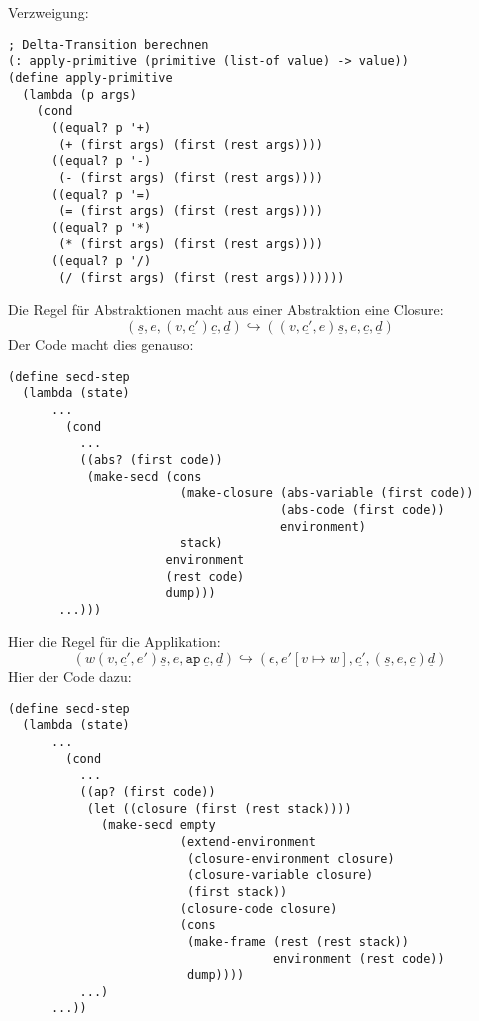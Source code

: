 Verzweigung:
%
\begin{verbatim}
; Delta-Transition berechnen
(: apply-primitive (primitive (list-of value) -> value))
(define apply-primitive
  (lambda (p args)
    (cond
      ((equal? p '+)
       (+ (first args) (first (rest args))))
      ((equal? p '-)
       (- (first args) (first (rest args))))
      ((equal? p '=)
       (= (first args) (first (rest args))))
      ((equal? p '*)
       (* (first args) (first (rest args))))
      ((equal? p '/)
       (/ (first args) (first (rest args)))))))
\end{verbatim}
%
Die Regel für Abstraktionen macht aus einer Abstraktion eine Closure:
\begin{displaymath}
  (\underline{s}, e, (v, \underline{c'}) \underline{c}, \underline{d})
  \hookrightarrow
  ((v, \underline{c'}, e) \underline{s}, e, \underline{c}, \underline{d})
\end{displaymath}
%
Der Code macht dies genauso:
%
\begin{verbatim}
(define secd-step
  (lambda (state)
      ...
        (cond
          ...
          ((abs? (first code))
           (make-secd (cons
                        (make-closure (abs-variable (first code))
                                      (abs-code (first code))
                                      environment)
                        stack)
                      environment
                      (rest code)
                      dump)))
       ...)))
\end{verbatim}
%
Hier die Regel für die Applikation:
%
\begin{displaymath}
  (w (v,\underline{c'}, e') \underline{s}, e, \mathtt{ap}~\underline{c}, \underline{d})
  \hookrightarrow
  (\epsilon, e'[v\mapsto w], \underline{c'}, (\underline{s}, e, \underline{c}) \underline{d})
\end{displaymath}
%
Hier der Code dazu:
%
\begin{verbatim}
(define secd-step
  (lambda (state)
      ...
        (cond
          ...
          ((ap? (first code))
           (let ((closure (first (rest stack))))
             (make-secd empty  
                        (extend-environment
                         (closure-environment closure)
                         (closure-variable closure)
                         (first stack))
                        (closure-code closure)
                        (cons
                         (make-frame (rest (rest stack))
                                     environment (rest code))
                         dump))))
          ...)
      ...))
\end{verbatim}
